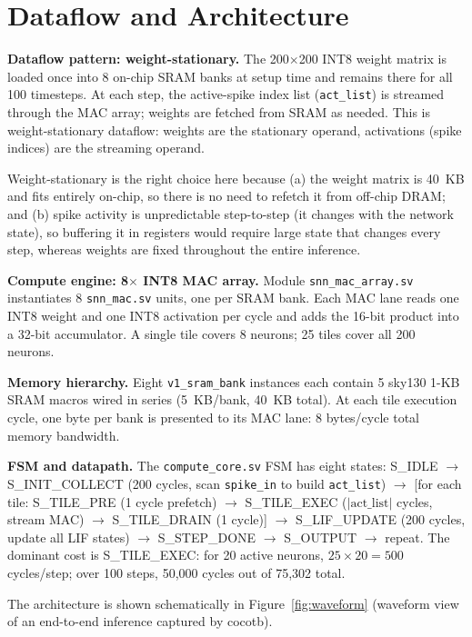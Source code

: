 \documentclass[11pt,letterpaper]{article}
\begin{document}
\section{Dataflow and Architecture}

\textbf{Dataflow pattern: weight-stationary.}
The 200$\times$200 INT8 weight matrix is loaded once into 8 on-chip SRAM banks
at setup time and remains there for all 100 timesteps. At each step, the
active-spike index list (\texttt{act\_list}) is streamed through the MAC array;
weights are fetched from SRAM as needed. This is weight-stationary dataflow:
weights are the stationary operand, activations (spike indices) are the
streaming operand.

Weight-stationary is the right choice here because (a) the weight matrix is
40~KB and fits entirely on-chip, so there is no need to refetch it from off-chip
DRAM; and (b) spike activity is unpredictable step-to-step (it changes with the
network state), so buffering it in registers would require large state that
changes every step, whereas weights are fixed throughout the entire inference.

\textbf{Compute engine: 8$\times$ INT8 MAC array.}
Module \texttt{snn\_mac\_array.sv} instantiates 8 \texttt{snn\_mac.sv} units,
one per SRAM bank. Each MAC lane reads one INT8 weight and one INT8 activation
per cycle and adds the 16-bit product into a 32-bit accumulator. A single tile
covers 8 neurons; 25 tiles cover all 200 neurons.

\textbf{Memory hierarchy.}
Eight \texttt{v1\_sram\_bank} instances each contain 5 sky130 1-KB SRAM macros
wired in series (5~KB/bank, 40~KB total). At each tile execution cycle, one
byte per bank is presented to its MAC lane: 8 bytes/cycle total memory
bandwidth.

\textbf{FSM and datapath.}
The \texttt{compute\_core.sv} FSM has eight states:
S\_IDLE $\to$ S\_INIT\_COLLECT (200 cycles, scan \texttt{spike\_in} to build
\texttt{act\_list}) $\to$ [for each tile: S\_TILE\_PRE (1 cycle prefetch) $\to$
S\_TILE\_EXEC ($|\text{act\_list}|$ cycles, stream MAC) $\to$ S\_TILE\_DRAIN
(1 cycle)] $\to$ S\_LIF\_UPDATE (200 cycles, update all LIF states) $\to$
S\_STEP\_DONE $\to$ S\_OUTPUT $\to$ repeat.
The dominant cost is S\_TILE\_EXEC: for 20 active neurons, $25 \times 20 = 500$
cycles/step; over 100 steps, 50,000 cycles out of 75,302 total.

The architecture is shown schematically in Figure~\ref{fig:waveform} (waveform
view of an end-to-end inference captured by cocotb).
\end{document}
